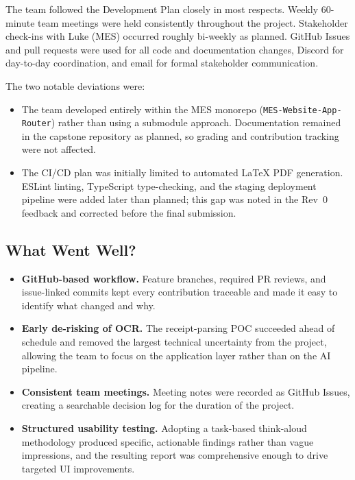 \documentclass{article}
\begin{document}
The team followed the Development Plan closely in most respects.  Weekly
60-minute team meetings were held consistently throughout the project.
Stakeholder check-ins with Luke (MES) occurred roughly bi-weekly as
planned.  GitHub Issues and pull requests were used for all code and
documentation changes, Discord for day-to-day coordination, and email for
formal stakeholder communication.

The two notable deviations were:
\begin{itemize}
  \item The team developed entirely within the MES monorepo
    (\texttt{MES-Website-App-Router}) rather than using a submodule
    approach.  Documentation remained in the capstone repository as
    planned, so grading and contribution tracking were not affected.
  \item The CI/CD plan was initially limited to automated LaTeX PDF
    generation.  ESLint linting, TypeScript type-checking, and the staging
    deployment pipeline were added later than planned; this gap was noted
    in the Rev~0 feedback and corrected before the final submission.
\end{itemize}

\subsection{What Went Well?}

\begin{itemize}
  \item \textbf{GitHub-based workflow.}  Feature branches, required PR
    reviews, and issue-linked commits kept every contribution traceable
    and made it easy to identify what changed and why.
  \item \textbf{Early de-risking of OCR.}  The receipt-parsing POC
    succeeded ahead of schedule and removed the largest technical
    uncertainty from the project, allowing the team to focus on the
    application layer rather than on the AI pipeline.
  \item \textbf{Consistent team meetings.}  Meeting notes were recorded as
    GitHub Issues, creating a searchable decision log for the duration of
    the project.
  \item \textbf{Structured usability testing.}  Adopting a task-based
    think-aloud methodology produced specific, actionable findings rather
    than vague impressions, and the resulting report was comprehensive
    enough to drive targeted UI improvements.
\end{itemize}
\end{document}
